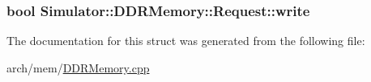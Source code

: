 \hypertarget{struct_simulator_1_1_d_d_r_memory_1_1_request_aeb2425d6ca513688bf087e1219a0ee4b}{
\subsubsection[{write}]{\setlength{\rightskip}{0pt plus 5cm}bool Simulator\+::\+D\+D\+R\+Memory\+::\+Request\+::write}}\label{struct_simulator_1_1_d_d_r_memory_1_1_request_aeb2425d6ca513688bf087e1219a0ee4b}


The documentation for this struct was generated from the following file\+:\begin{DoxyCompactItemize}
\item 
arch/mem/\hyperlink{_d_d_r_memory_8cpp}{D\+D\+R\+Memory.\+cpp}\end{DoxyCompactItemize}
